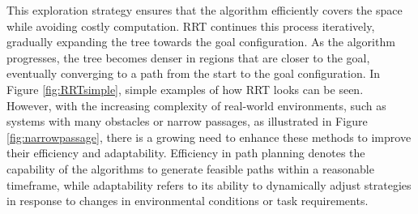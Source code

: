 \documentclass{ctuthesis}
\begin{document}
This exploration strategy ensures that the algorithm efficiently covers the space while avoiding costly computation.
RRT continues this process iteratively, gradually expanding the tree towards the goal configuration. 
As the algorithm progresses, the tree becomes denser in regions that are closer to the goal, eventually converging to a path from the start to the goal configuration.
In Figure \ref{fig:RRTsimple}, simple examples of how RRT looks can be seen.\\[12pt]
However, with the increasing complexity of real-world environments, 
such as systems with many obstacles or narrow passages, as illustrated in Figure \ref{fig:narrowpassage},
there is a growing need to enhance these methods to improve their efficiency and
adaptability.
Efficiency in path planning denotes the capability of the algorithms to generate feasible paths within a reasonable timeframe, 
while adaptability refers to its ability to dynamically adjust strategies in response to changes in environmental conditions or task requirements.
 
\end{document}
